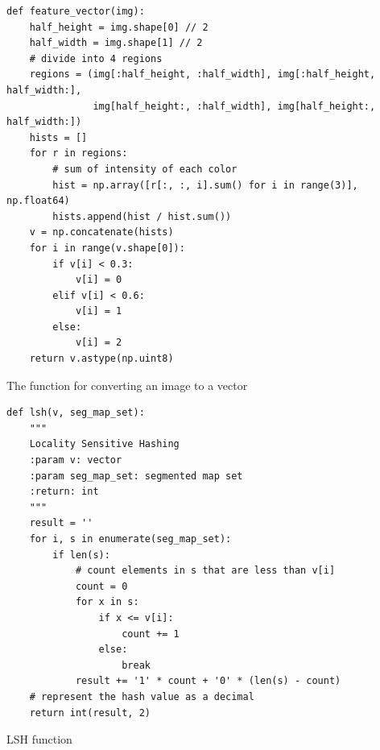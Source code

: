 \documentclass{ee208report}
\begin{document}
\begin{listing}
    \begin{verbatim}
def feature_vector(img):
    half_height = img.shape[0] // 2
    half_width = img.shape[1] // 2
    # divide into 4 regions
    regions = (img[:half_height, :half_width], img[:half_height, half_width:],
               img[half_height:, :half_width], img[half_height:, half_width:])
    hists = []
    for r in regions:
        # sum of intensity of each color
        hist = np.array([r[:, :, i].sum() for i in range(3)], np.float64)
        hists.append(hist / hist.sum())
    v = np.concatenate(hists)
    for i in range(v.shape[0]):
        if v[i] < 0.3:
            v[i] = 0
        elif v[i] < 0.6:
            v[i] = 1
        else:
            v[i] = 2
    return v.astype(np.uint8)
    \end{verbatim}
    \caption{The function for converting an image to a vector}
    \label{lst:feature-vector}
\end{listing}

\begin{listing}
    \begin{verbatim}
def lsh(v, seg_map_set):
    """
    Locality Sensitive Hashing
    :param v: vector
    :param seg_map_set: segmented map set
    :return: int
    """
    result = ''
    for i, s in enumerate(seg_map_set):
        if len(s):
            # count elements in s that are less than v[i]
            count = 0
            for x in s:
                if x <= v[i]:
                    count += 1
                else:
                    break
            result += '1' * count + '0' * (len(s) - count)
    # represent the hash value as a decimal
    return int(result, 2)
    \end{verbatim}
    \caption{LSH function}
    \label{lst:lsh}
\end{listing}
\end{document}
